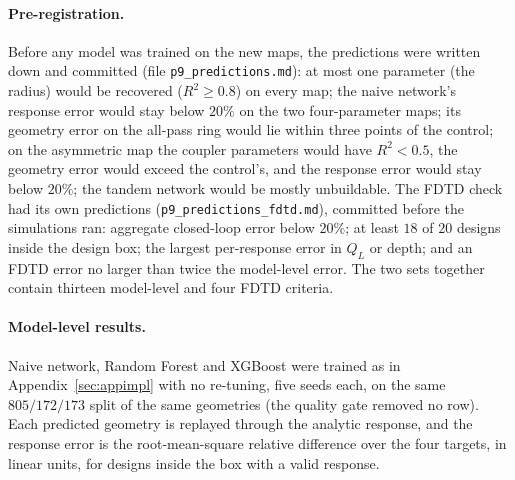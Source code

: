 \documentclass[11pt]{article}
\newcommand{\QL}{Q_L}
\begin{document}
\paragraph{Pre-registration.} Before any model was trained on the new maps, the predictions were written down and committed (file \texttt{p9\_predictions.md}): at most one parameter (the radius) would be recovered ($R^2 \ge 0.8$) on every map; the naive network's response error would stay below $20\%$ on the two four-parameter maps; its geometry error on the all-pass ring would lie within three points of the control; on the asymmetric map the coupler parameters would have $R^2 < 0.5$, the geometry error would exceed the control's, and the response error would stay below $20\%$; the tandem network would be mostly unbuildable. The FDTD check had its own predictions (\texttt{p9\_predictions\_fdtd.md}), committed before the simulations ran: aggregate closed-loop error below $20\%$; at least $18$ of $20$ designs inside the design box; the largest per-response error in $\QL$ or depth; and an FDTD error no larger than twice the model-level error. The two sets together contain thirteen model-level and four FDTD criteria.

\paragraph{Model-level results.} Naive network, Random Forest and XGBoost were trained as in Appendix~\ref{sec:appimpl} with no re-tuning, five seeds each, on the same $805/172/173$ split of the same geometries (the quality gate removed no row). Each predicted geometry is replayed through the analytic response, and the response error is the root-mean-square relative difference over the four targets, in linear units, for designs inside the box with a valid response.
\end{document}
